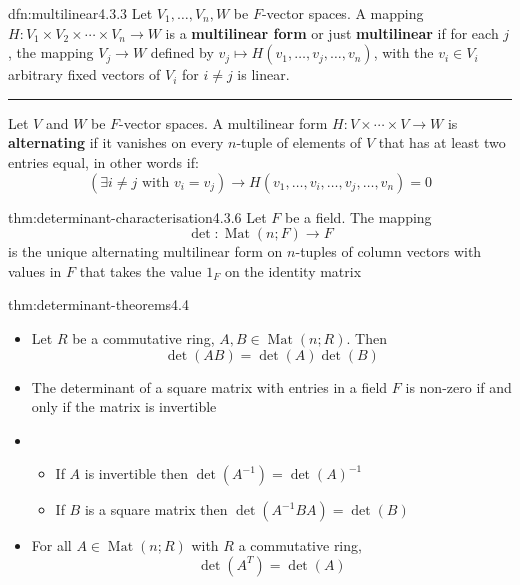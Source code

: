\documentclass[landscape, 8pt]{extarticle}
\DeclareMathOperator{\Mat}{Mat}
\begin{document}
\begin{multicols}{3}
\begin{dfn}{dfn:multilinear}{4.3.3}
    Let $V_{1},\dots,V_{n}, W$ be $F$-vector spaces. A mapping $H : V_{1} \times V_{2} \times \cdots \times V_{n} \to W$ is a \textbf{multilinear form} or just \textbf{multilinear} if for each $j$, the mapping $V_{j}\to W$ defined by $v_{j}\mapsto H(v_{1},\dots,v_{j},\dots,v_{n})$, with the $v_{i}\in V_{i}$ arbitrary fixed vectors of $V_{i}$ for $i\ne j$ is linear. 

    \noindent\rule{\textwidth}{0.2pt}
    Let $V$ and $W$ be $F$-vector spaces. A multilinear form $ H : V \times \cdots \times V \to W$ is \textbf{alternating} if it vanishes on every $n$-tuple of elements of $V$ that has at least two entries equal, in other words if:
    \[(\exists i\ne j \text{ with } v_{i} = v_{j})\to H(v_{1},\dots,v_{i},\dots,v_{j},\dots,v_{n}) = 0\]
\end{dfn}

\begin{thm}{thm:determinant-characterisation}{4.3.6}
    Let $F$ be a field. The mapping
    \[\det : \Mat(n;F) \to F\]
    is the unique alternating multilinear form on $n$-tuples of column vectors with values in $F$ that takes the value $1_{F}$ on the identity matrix
\end{thm}

\begin{thm}{thm:determinant-theorems}{4.4}
    \begin{itemize}
        \item[\textbf{4.4.1}:] Let $R$ be a commutative ring, $A, B\in \Mat(n; R)$. Then
            \[\det(AB) = \det(A)\det(B)\]
        \item[\textbf{4.4.2}:] The determinant of a square matrix with entries in a field $F$ is non-zero if and only if the matrix is invertible
        \item[\textbf{4.4.3}:] \begin{itemize}
            \item If $A$ is invertible then $\det(A^{-1}) = \det(A)^{-1}$
            \item If $B$ is a square matrix then $\det(A^{-1}BA) = \det(B)$
        \end{itemize} 
        \item[\textbf{4.4.4}:] For all $A\in \Mat(n;R)$ with $R$ a commutative ring,
    \[\det(A^{T}) = \det(A)\]

    \end{itemize}
\end{thm}


\end{multicols}
\end{document}
